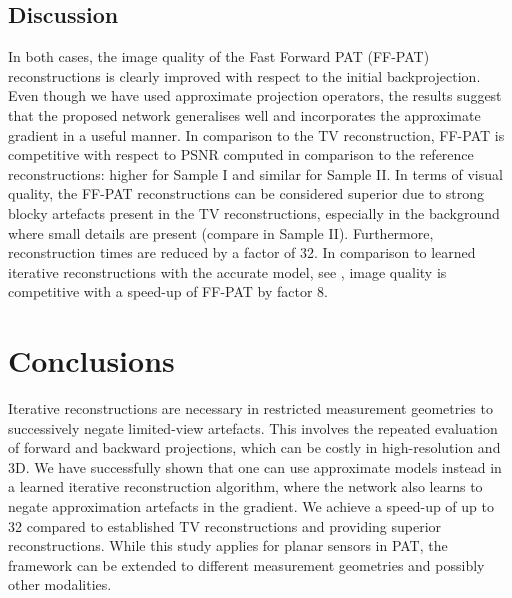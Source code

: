 \documentclass[runningheads]{llncs}
\begin{document}

\vspace{-3em}
\subsection{Discussion}
In both cases, the image quality of the Fast Forward PAT (FF-PAT) reconstructions is clearly improved with respect to the initial backprojection. Even though we have used approximate projection operators, the results suggest that the proposed network generalises well and incorporates the approximate gradient in a useful manner. In comparison to the TV reconstruction, FF-PAT is competitive with respect to PSNR computed in comparison to the reference reconstructions: higher for Sample I and similar for Sample II. In terms of visual quality, the FF-PAT reconstructions can be considered superior due to strong blocky artefacts present in the TV reconstructions, especially in the background where small details are present (compare in Sample II). Furthermore, reconstruction times are reduced by a factor of 32. In comparison to learned iterative reconstructions with the accurate model, see \cite{Hauptmann2018}, image quality is competitive with a speed-up of FF-PAT by factor 8.

\section{Conclusions}
Iterative reconstructions are necessary in restricted measurement 
geometries to successively negate limited-view artefacts. This involves 
the repeated evaluation of forward and backward projections, which can 
be costly in high-resolution and 3D. We have successfully shown that 
one can use approximate models instead in a learned iterative 
reconstruction algorithm, where the network also learns to negate 
approximation artefacts in the gradient. We achieve a speed-up of up to 32 compared to established TV reconstructions and providing 
superior reconstructions. While this study applies for planar sensors 
in PAT, the framework can be extended to different measurement 
geometries and possibly other modalities.
\end{document}

